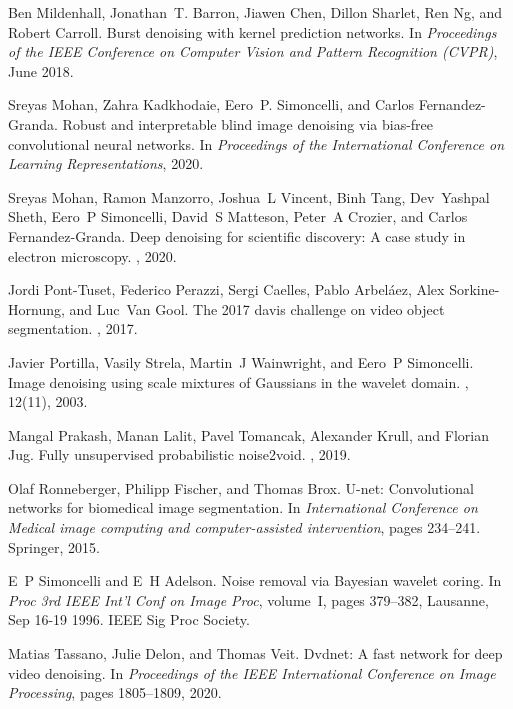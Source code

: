 \documentclass[final]{cvpr}
\begin{document}
{\begin{thebibliography}{10}
Ben Mildenhall, Jonathan~T. Barron, Jiawen Chen, Dillon Sharlet, Ren Ng, and
  Robert Carroll.
\newblock Burst denoising with kernel prediction networks.
\newblock In {\em Proceedings of the IEEE Conference on Computer Vision and
  Pattern Recognition (CVPR)}, June 2018.

Sreyas Mohan, Zahra Kadkhodaie, Eero~P. Simoncelli, and Carlos
  Fernandez-Granda.
\newblock Robust and interpretable blind image denoising via bias-free
  convolutional neural networks.
\newblock In {\em Proceedings of the International Conference on Learning
  Representations}, 2020.

Sreyas Mohan, Ramon Manzorro, Joshua~L Vincent, Binh Tang, Dev~Yashpal Sheth,
  Eero~P Simoncelli, David~S Matteson, Peter~A Crozier, and Carlos
  Fernandez-Granda.
\newblock Deep denoising for scientific discovery: A case study in electron
  microscopy.
, 2020.

Jordi Pont-Tuset, Federico Perazzi, Sergi Caelles, Pablo Arbeláez, Alex
  Sorkine-Hornung, and Luc~Van Gool.
\newblock The 2017 davis challenge on video object segmentation.
, 2017.

Javier Portilla, Vasily Strela, Martin~J Wainwright, and Eero~P Simoncelli.
\newblock Image denoising using scale mixtures of {Gaussians} in the wavelet
  domain.
, 12(11), 2003.

Mangal Prakash, Manan Lalit, Pavel Tomancak, Alexander Krull, and Florian Jug.
\newblock Fully unsupervised probabilistic noise2void.
, 2019.

Olaf Ronneberger, Philipp Fischer, and Thomas Brox.
\newblock U-net: Convolutional networks for biomedical image segmentation.
\newblock In {\em International Conference on Medical image computing and
  computer-assisted intervention}, pages 234--241. Springer, 2015.

E~P Simoncelli and E~H Adelson.
\newblock Noise removal via {Bayesian} wavelet coring.
\newblock In {\em Proc 3rd IEEE Int'l Conf on Image Proc}, volume~I, pages
  379--382, Lausanne, Sep 16-19 1996. IEEE Sig Proc Society.

Matias Tassano, Julie Delon, and Thomas Veit.
\newblock Dvdnet: A fast network for deep video denoising.
\newblock In {\em Proceedings of the IEEE International Conference on Image
  Processing}, pages 1805--1809, 2020.


\end{thebibliography}}
\end{document}
